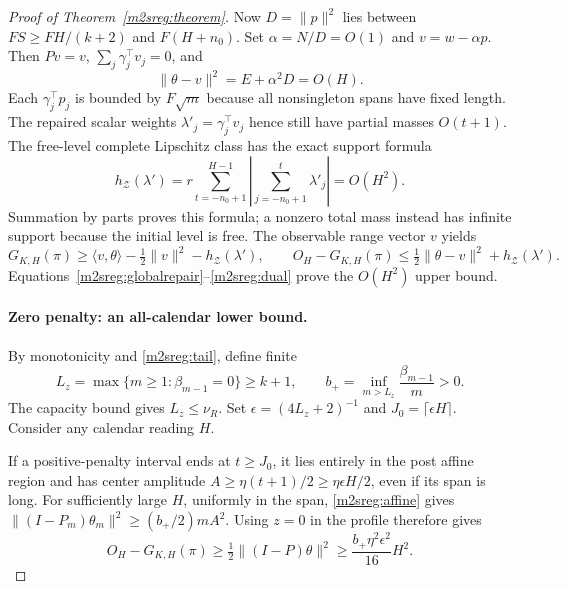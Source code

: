 \begin{proof}[Proof of Theorem~\ref{m2sreg:theorem}]
Now $D=\|p\|^2$ lies between $FS\ge FH/(k+2)$ and $F(H+n_0)$.
Set $\alpha=N/D=O(1)$ and $v=w-\alpha p$.
Then $Pv=v$, $\sum_j\gamma_j^\top v_j=0$, and
\begin{equation}\label{m2sreg:globalrepair}
\|\theta-v\|^2=E+\alpha^2D=O(H).
\end{equation}
Each $\gamma_j^\top p_j$ is bounded by $F\sqrt m$ because
all nonsingleton spans have fixed length. The repaired scalar weights
$\lambda'_j=\gamma_j^\top v_j$ hence still have partial masses $O(t+1)$.
The free-level complete Lipschitz class has the exact support formula
\begin{equation}\label{m2sreg:support}
h_{\mathcal Z}(\lambda')=
r\sum_{t=-n_0+1}^{H-1}
 \left|\sum_{j=-n_0+1}^t\lambda'_j\right|=O(H^2).
\end{equation}
Summation by parts proves this formula; a nonzero total mass instead
has infinite support because the initial level is free.
The observable range vector $v$ yields
\begin{equation}\label{m2sreg:dual}
G_{K,H}(\pi)\ge
 \langle v,\theta\rangle-\tfrac12\|v\|^2-h_{\mathcal Z}(\lambda'),
\qquad
O_H-G_{K,H}(\pi)\le
 \tfrac12\|\theta-v\|^2+h_{\mathcal Z}(\lambda').
\end{equation}
Equations~\eqref{m2sreg:globalrepair}--\eqref{m2sreg:dual}
prove the $O(H^2)$ upper bound.

\paragraph{Zero penalty: an all-calendar lower bound.}
By monotonicity and \eqref{m2sreg:tail}, define finite
\[
L_z=\max\{m\ge1:\beta_{m-1}=0\}\ge k+1,\qquad
b_+=\inf_{m>L_z}\frac{\beta_{m-1}}m>0 .
\]
The capacity bound gives $L_z\le\nu_R$.
Set $\epsilon=(4L_z+2)^{-1}$ and $J_0=\lceil\epsilon H\rceil$.
Consider any calendar reading $H$.

If a positive-penalty interval ends at $t\ge J_0$, it lies entirely
in the post affine region and has center amplitude
$A\ge\eta(t+1)/2\ge\eta\epsilon H/2$, even if its span is long.
For sufficiently large $H$, uniformly in the span,
\eqref{m2sreg:affine} gives
$\|(I-P_m)\theta_m\|^2\ge(b_+/2)mA^2$.
Using $z=0$ in the profile therefore gives
\begin{equation}\label{m2sreg:positivecase}
O_H-G_{K,H}(\pi)\ge\tfrac12\|(I-P)\theta\|^2
\ge \frac{b_+\eta^2\epsilon^2}{16}H^2 .
\end{equation}


\end{proof}
